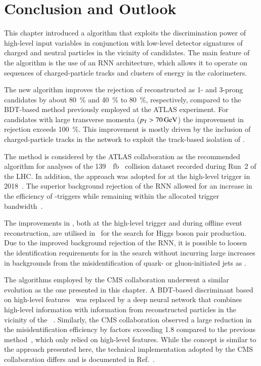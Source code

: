 \section{Conclusion and Outlook}%
\label{sec:tauid_conclusion}

This chapter introduced a \tauid algorithm that exploits the discrimination
power of high-level input variables in conjunction with low-level detector
signatures of charged and neutral particles in the vicinity of \tauhadvis
candidates. The main feature of the algorithm is the use of an RNN architecture,
which allows it to operate on sequences of charged-particle tracks and clusters
of energy in the calorimeters.

The new algorithm improves the rejection of \faketauhadvis reconstructed as 1-
and 3-prong \tauhadvis candidates by about \SI{80}{\percent} and
\SI{40}{\percent} to \SI{80}{\percent}, respectively, compared to the BDT-based
method previously employed at the ATLAS experiment. For \tauhadvis candidates
with large transverse momenta ($\pT > \SI{70}{\GeV}$) the improvement in
\faketauhadvis rejection exceeds \SI{100}{\percent}. This improvement is mostly
driven by the inclusion of charged-particle tracks in the network to exploit the
track-based isolation of \tauhadvis.

The method is considered by the ATLAS collaboration as the recommended \tauid
algorithm for analyses of the \SI{139}{\per\femto\barn} \pp~collision dataset
recorded during Run~2 of the LHC. In addition, the approach was adopted for
\tauid at the high-level trigger in 2018~\cite{ATL-DAQ-PUB-2019-001}. The
superior background rejection of the RNN \tauid allowed for an increase in the
efficiency of \tauhadvis-triggers while remaining within the allocated trigger
bandwidth~\cite{ATL-DAQ-PUB-2019-001}.

The improvements in \tauid, both at the high-level trigger and during offline
event reconstruction, are utilised in~ for the search for
Higgs boson pair production. Due to the improved background rejection of the
RNN, it is possible to loosen the identification requirements for \tauhadvis in
the search without incurring large increases in backgrounds from the
misidentification of quark- or gluon-initiated jets as \tauhadvis.

The \tauid algorithms employed by the CMS collaboration underwent a similar
evolution as the one presented in this chapter. A BDT-based discriminant based
on high-level features~\cite{CMS-TAU-16-003} was replaced by a deep neural
network that combines high-level information with information from reconstructed
particles in the vicinity of the \tauhadvis~\cite{CMS-TAU-20-001}. Similarly,
the CMS collaboration observed a large reduction in the \faketauhadvis
misidentification efficiency by factors exceeding 1.8 compared to the previous
method~\cite{CMS-TAU-20-001}, which only relied on high-level features. While
the concept is similar to the approach presented here, the technical
implementation adopted by the CMS collaboration differs and is documented in
Ref.~\cite{CMS-TAU-20-001}.

